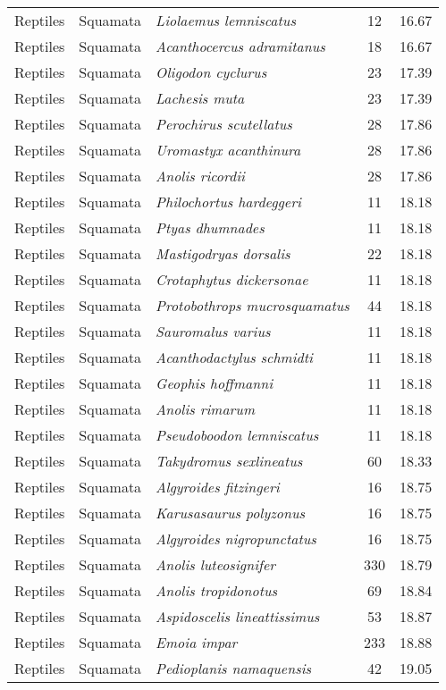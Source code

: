 \begin{longtable}{ll>{\itshape}lcc}
  Reptiles & Squamata & Liolaemus lemniscatus &  12 & 16.67 \\ 
  Reptiles & Squamata & Acanthocercus adramitanus &  18 & 16.67 \\ 
  Reptiles & Squamata & Oligodon cyclurus &  23 & 17.39 \\ 
  Reptiles & Squamata & Lachesis muta &  23 & 17.39 \\ 
  Reptiles & Squamata & Perochirus scutellatus &  28 & 17.86 \\ 
  Reptiles & Squamata & Uromastyx acanthinura &  28 & 17.86 \\ 
  Reptiles & Squamata & Anolis ricordii &  28 & 17.86 \\ 
  Reptiles & Squamata & Philochortus hardeggeri &  11 & 18.18 \\ 
  Reptiles & Squamata & Ptyas dhumnades &  11 & 18.18 \\ 
  Reptiles & Squamata & Mastigodryas dorsalis &  22 & 18.18 \\ 
  Reptiles & Squamata & Crotaphytus dickersonae &  11 & 18.18 \\ 
  Reptiles & Squamata & Protobothrops mucrosquamatus &  44 & 18.18 \\ 
  Reptiles & Squamata & Sauromalus varius &  11 & 18.18 \\ 
  Reptiles & Squamata & Acanthodactylus schmidti &  11 & 18.18 \\ 
  Reptiles & Squamata & Geophis hoffmanni &  11 & 18.18 \\ 
  Reptiles & Squamata & Anolis rimarum &  11 & 18.18 \\ 
  Reptiles & Squamata & Pseudoboodon lemniscatus &  11 & 18.18 \\ 
  Reptiles & Squamata & Takydromus sexlineatus &  60 & 18.33 \\ 
  Reptiles & Squamata & Algyroides fitzingeri &  16 & 18.75 \\ 
  Reptiles & Squamata & Karusasaurus polyzonus &  16 & 18.75 \\ 
  Reptiles & Squamata & Algyroides nigropunctatus &  16 & 18.75 \\ 
  Reptiles & Squamata & Anolis luteosignifer & 330 & 18.79 \\ 
  Reptiles & Squamata & Anolis tropidonotus &  69 & 18.84 \\ 
  Reptiles & Squamata & Aspidoscelis lineattissimus &  53 & 18.87 \\ 
  Reptiles & Squamata & Emoia impar & 233 & 18.88 \\ 
  Reptiles & Squamata & Pedioplanis namaquensis &  42 & 19.05 \\ 

\end{longtable}
